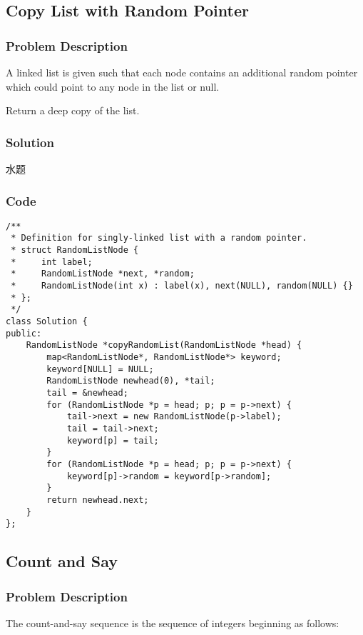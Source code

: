 \documentclass[courier]{article}
\begin{document}
\begin{CJK*}{UTF8}{gkai}
\subsection{ Copy List with Random Pointer }

\subsubsection*{Problem Description}
A linked list is given such that each node contains an additional random pointer which could point to any node in the list or null.

Return a deep copy of the list.



\subsubsection*{Solution}
水题

\subsubsection*{Code}
\begin{lstlisting}
/**
 * Definition for singly-linked list with a random pointer.
 * struct RandomListNode {
 *     int label;
 *     RandomListNode *next, *random;
 *     RandomListNode(int x) : label(x), next(NULL), random(NULL) {}
 * };
 */
class Solution {
public:
    RandomListNode *copyRandomList(RandomListNode *head) {
        map<RandomListNode*, RandomListNode*> keyword;
        keyword[NULL] = NULL;
        RandomListNode newhead(0), *tail;
        tail = &newhead;
        for (RandomListNode *p = head; p; p = p->next) {
            tail->next = new RandomListNode(p->label);
            tail = tail->next;
            keyword[p] = tail;
        }
        for (RandomListNode *p = head; p; p = p->next) {
            keyword[p]->random = keyword[p->random];
        }
        return newhead.next;
    }
}; 
\end{lstlisting}


\subsection{ Count and Say }

\subsubsection*{Problem Description}
The count-and-say sequence is the sequence of integers beginning as follows:



\end{CJK*}
\end{document}
